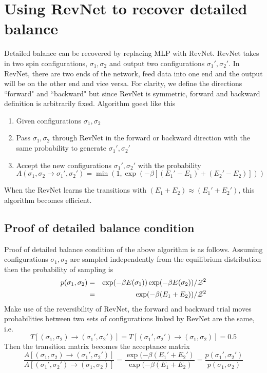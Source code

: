 \documentclass{article}
\begin{document}
\section{Using RevNet to recover detailed balance}
Detailed balance can be recovered by replacing MLP with RevNet. 
RevNet takes in two spin configurations, $\sigma_1,\sigma_2$
and output two configurations $\sigma_1',\sigma_2'$.
In RevNet, there are two ends of the network, feed data into
one end and the output will be on the other end and vice versa.
For clarity, we define the directions ``forward" and ``backward"
but since RevNet is symmetric, forward and backward definition
is arbitrarily fixed.
Algorithm goest like this
\begin{enumerate}
\item Given configurations $\sigma_1,\sigma_2$
\item Pass $\sigma_1,\sigma_2$ through RevNet in the forward 
or backward direction with the same probability
to generate $\sigma_1',\sigma_2'$
\item Accept the new configurations $\sigma_1',\sigma_2'$ with the probability
\begin{equation}
A(\sigma_1,\sigma_2 \rightarrow \sigma_1',\sigma_2') = \min(1,\exp(-\beta [(E_1'-E_1)+(E_2'-E_2)] ))
\end{equation}
\end{enumerate}
When the RevNet learns the transitions with $(E_1+E_2)\approx (E_1'+E_2')$, 
this algorithm becomes efficient.

\subsection{Proof of detailed balance condition}
Proof of detailed balance condition of the above algorithm is as follows.
Assuming configurations $\sigma_1,\sigma_2$ are sampled independently
from the equilibrium distribution then the probability of sampling is
\begin{eqnarray} \nonumber
p(\sigma_1,\sigma_2) & = & \exp(-\beta E(\sigma_1)) \exp(-\beta E(\sigma_2))  / {\cal Z}^2 \\
                     & = & \exp(-\beta (E_1+E_2)) / {\cal Z}^2
\end{eqnarray}
Make use of the reversibility of RevNet, the forward and backward 
trial moves probabilities 
between two sets of configurations linked by RevNet are the same, i.e.
\begin{equation}
T[ (\sigma_1 ,\sigma_2 ) \rightarrow (\sigma_1',\sigma_2')] =
T[ (\sigma_1',\sigma_2') \rightarrow (\sigma_1 ,\sigma_2 )] = 0.5
\end{equation}
Then the transition matrix becomes the acceptance matrix
\begin{equation}
\frac{A[ (\sigma_1 ,\sigma_2 ) \rightarrow (\sigma_1',\sigma_2')]}
     {A[ (\sigma_1',\sigma_2') \rightarrow (\sigma_1 ,\sigma_2 )]} = 
     \frac{\exp(-\beta (E_1'+E_2')}
          {\exp(-\beta (E_1 +E_2 )} =
     \frac{p(\sigma_1',\sigma_2')}{p(\sigma_1,\sigma_2)}
\end{equation}
\end{document}
